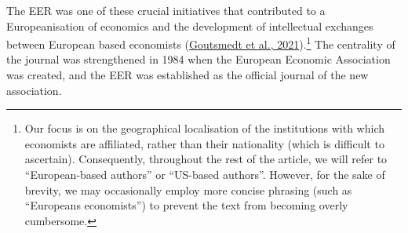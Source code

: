 \documentclass[
  12pt,
  onecolumn]{article}
\begin{document}
\begin{table}[!h]

\caption{\label{tab:table-authors}Share of countries of authors' affiliations in EER publications (Top 10)}
\centering
{}
\end{table}

The EER was one of these crucial initiatives that contributed to a Europeanisation of economics and the development of intellectual exchanges between European based economists (\protect\hyperlink{ref-goutsmedt2021}{Goutsmedt et al., 2021}).\footnote{Our focus is on the geographical localisation of the institutions with which economists are affiliated, rather than their nationality (which is difficult to ascertain). Consequently, throughout the rest of the article, we will refer to ``European-based authors'' or ``US-based authors''. However, for the sake of brevity, we may occasionally employ more concise phrasing (such as ``Europeans economists'') to prevent the text from becoming overly cumbersome.} The centrality of the journal was strengthened in 1984 when the European Economic Association was created, and the EER was established as the official journal of the new association.
\end{document}
